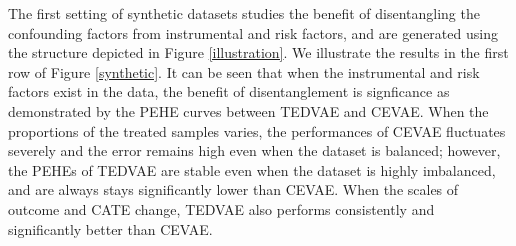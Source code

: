 \documentclass[letterpaper]{article} %
\begin{document}

The first setting of synthetic datasets studies the benefit of disentangling the confounding factors from instrumental and risk factors, and are generated using the structure depicted in Figure \ref{illustration}. 
We illustrate the results in the first row of Figure \ref{synthetic}. It can be seen that when the instrumental and risk factors exist in the data, the benefit of disentanglement is signficance as demonstrated by the PEHE curves between TEDVAE and CEVAE. When the proportions of the treated samples varies, the performances of CEVAE fluctuates severely and the error remains high even when the dataset is balanced; however, the PEHEs of TEDVAE are stable even when the dataset is highly imbalanced, and are always stays significantly lower than CEVAE. When the scales of outcome and CATE change, TEDVAE also performs consistently and significantly better than CEVAE. 
\end{document}
